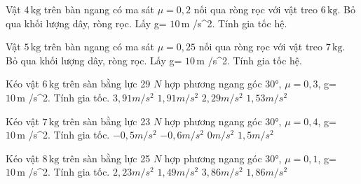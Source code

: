 \begin{bt}
Vật $4\,\text{kg}$ trên bàn ngang có ma sát $\mu=0,2$ nối qua ròng rọc với vật treo $6\,\text{kg}$. Bỏ qua khối lượng dây, ròng rọc. Lấy g= $10\,\text{m}$ /s^2. Tính gia tốc hệ.
\end{bt}

\begin{bt}
Vật $5\,\text{kg}$ trên bàn ngang có ma sát $\mu=0,25$ nối qua ròng rọc với vật treo $7\,\text{kg}$. Bỏ qua khối lượng dây, ròng rọc. Lấy g= $10\,\text{m}$ /s^2. Tính gia tốc hệ.
\end{bt}

\begin{ex}
Kéo vật $6\,\text{kg}$ trên sàn bằng lực 29 $N$ hợp phương ngang góc 30°, $\mu=0,3$, g= $10\,\text{m}$ /s^2. Tính gia tốc.
\choice
{$3,91 m/s^2$}
{\True $1,91 m/s^2$}
{$2,29 m/s^2$}
{$1,53 m/s^2$}
\end{ex}

\begin{ex}
Kéo vật $7\,\text{kg}$ trên sàn bằng lực 23 $N$ hợp phương ngang góc 30°, $\mu=0,4$, g= $10\,\text{m}$ /s^2. Tính gia tốc.
\choice
{\True $-0,5 m/s^2$}
{$-0,6 m/s^2$}
{$0 m/s^2$}
{$1,5 m/s^2$}
\end{ex}

\begin{ex}
Kéo vật $8\,\text{kg}$ trên sàn bằng lực 25 $N$ hợp phương ngang góc 30°, $\mu=0,1$, g= $10\,\text{m}$ /s^2. Tính gia tốc.
\choice
{$2,23 m/s^2$}
{$1,49 m/s^2$}
{$3,86 m/s^2$}
{\True $1,86 m/s^2$}
\end{ex}

